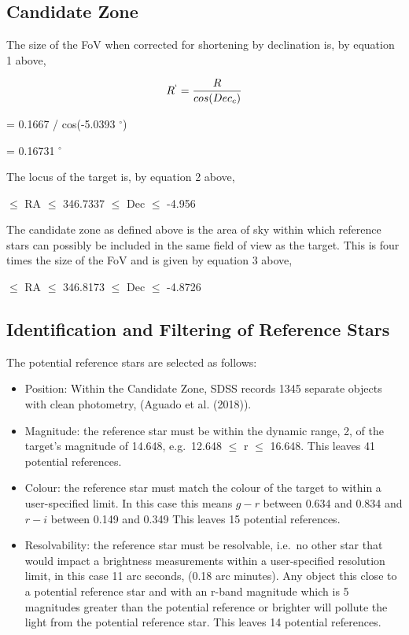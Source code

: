 \documentclass[]{elsarticle} %
\providecommand{\tightlist}{%
  \setlength{\itemsep}{0pt}\setlength{\parskip}{0pt}}
\begin{document}
\hypertarget{candidate-zone-1}{%
\subsection{Candidate Zone}\label{candidate-zone-1}}

The size of the FoV when corrected for shortening by declination is, by
equation 1 above,

\[R^` = {\frac{R}{cos(Dec_c)}}\]

\center = 0.1667 / cos(-5.0393 \(^{\circ}\)) \center

\center = 0.16731 \(^{\circ}\) \center

The locus of the target is, by equation 2 above,

 \(\leq\) RA \(\leq\) 346.7337 \center {}
\(\leq\) Dec \(\leq\) -4.956 \center

The candidate zone as defined above is the area of sky within which
reference stars can possibly be included in the same field of view as
the target. This is four times the size of the FoV and is given by
equation 3 above,

 \(\leq\) RA \(\leq\) 346.8173 \center {}
\(\leq\) Dec \(\leq\) -4.8726 \center

\newpage

\hypertarget{identification-and-filtering-of-reference-stars-1}{%
\subsection{Identification and Filtering of Reference
Stars}\label{identification-and-filtering-of-reference-stars-1}}

The potential reference stars are selected as follows:

\begin{itemize}
\tightlist
\item
  Position: Within the Candidate Zone, SDSS records 1345 separate
  objects with clean photometry, (Aguado et al. (2018)).
\item
  Magnitude: the reference star must be within the dynamic range, 2, of
  the target's magnitude of 14.648, e.g.~12.648 \(\leq\) r \(\leq\)
  16.648. This leaves 41 potential references.
\item
  Colour: the reference star must match the colour of the target to
  within a user-specified limit. In this case this means \(g - r\)
  between 0.634 and 0.834 and \(r - i\) between 0.149 and 0.349 This
  leaves 15 potential references.
\item
  Resolvability: the reference star must be resolvable, i.e.~no other
  star that would impact a brightness measurements within a
  user-specified resolution limit, in this case 11 arc seconds, (0.18
  arc minutes). Any object this close to a potential reference star and
  with an r-band magnitude which is 5 magnitudes greater than the
  potential reference or brighter will pollute the light from the
  potential reference star. This leaves 14 potential references.
\end{itemize}
\end{document}
